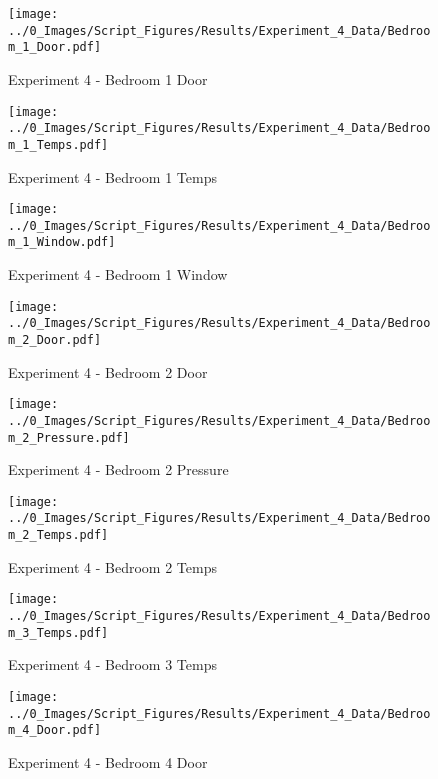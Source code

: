 	\begin{figure}[H]
		\centering
		\texttt{[image: ../0\_Images/Script\_Figures/Results/Experiment\_4\_Data/Bedroom\_1\_Door.pdf]}
		\caption[]{Experiment 4 - Bedroom 1 Door}
	\end{figure}
 

	\begin{figure}[H]
		\centering
		\texttt{[image: ../0\_Images/Script\_Figures/Results/Experiment\_4\_Data/Bedroom\_1\_Temps.pdf]}
		\caption[]{Experiment 4 - Bedroom 1 Temps}
	\end{figure}
 
	\clearpage

	\begin{figure}[H]
		\centering
		\texttt{[image: ../0\_Images/Script\_Figures/Results/Experiment\_4\_Data/Bedroom\_1\_Window.pdf]}
		\caption[]{Experiment 4 - Bedroom 1 Window}
	\end{figure}
 

	\begin{figure}[H]
		\centering
		\texttt{[image: ../0\_Images/Script\_Figures/Results/Experiment\_4\_Data/Bedroom\_2\_Door.pdf]}
		\caption[]{Experiment 4 - Bedroom 2 Door}
	\end{figure}
 
	\clearpage

	\begin{figure}[H]
		\centering
		\texttt{[image: ../0\_Images/Script\_Figures/Results/Experiment\_4\_Data/Bedroom\_2\_Pressure.pdf]}
		\caption[]{Experiment 4 - Bedroom 2 Pressure}
	\end{figure}
 

	\begin{figure}[H]
		\centering
		\texttt{[image: ../0\_Images/Script\_Figures/Results/Experiment\_4\_Data/Bedroom\_2\_Temps.pdf]}
		\caption[]{Experiment 4 - Bedroom 2 Temps}
	\end{figure}
 
	\clearpage

	\begin{figure}[H]
		\centering
		\texttt{[image: ../0\_Images/Script\_Figures/Results/Experiment\_4\_Data/Bedroom\_3\_Temps.pdf]}
		\caption[]{Experiment 4 - Bedroom 3 Temps}
	\end{figure}
 

	\begin{figure}[H]
		\centering
		\texttt{[image: ../0\_Images/Script\_Figures/Results/Experiment\_4\_Data/Bedroom\_4\_Door.pdf]}
		\caption[]{Experiment 4 - Bedroom 4 Door}
	\end{figure}
 
